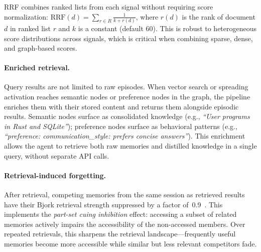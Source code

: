 \noindent RRF combines ranked lists from each signal without requiring
score normalization: $\text{RRF}(d) = \sum_{r \in R} \frac{1}{k + r(d)}$,
where $r(d)$ is the rank of document $d$ in ranked list $r$ and $k$ is a
constant (default 60). This is robust to heterogeneous score distributions
across signals, which is critical when combining sparse, dense, and
graph-based scores.

\paragraph{Enriched retrieval.}
Query results are not limited to raw episodes. When vector search or
spreading activation reaches semantic nodes or preference nodes in the
graph, the pipeline enriches them with their stored content and returns
them alongside episodic results. Semantic nodes surface as consolidated
knowledge (e.g., \emph{``User programs in Rust and SQLite''}); preference
nodes surface as behavioral patterns (e.g., \emph{``preference:
communication\_style: prefers concise answers''}). This enrichment
allows the agent to retrieve both raw memories and distilled knowledge in
a single query, without separate API calls.

\paragraph{Retrieval-induced forgetting.}
After retrieval, competing memories from the same session as retrieved
results have their Bjork retrieval strength suppressed by a factor
of~0.9~\cite{anderson1994}. This implements the \emph{part-set cuing
inhibition} effect: accessing a subset of related memories actively
impairs the accessibility of the non-accessed members. Over repeated
retrievals, this sharpens the retrieval landscape---frequently useful
memories become more accessible while similar but less relevant
competitors fade.
